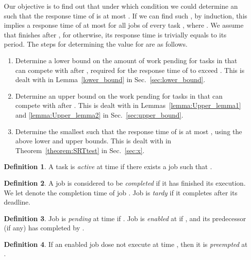\documentclass[Times, 10pt,twocolumn]{article}
\theoremstyle{definition}
\newtheorem{definition}{\textbf{Definition}}
\begin{document}
Our objective is to find out that under which condition we could determine an  such that the response time of  is at most . If we can find such , by induction, this implies a response time of at most  for all jobs of every task , where . We assume that  finishes after , for otherwise, its response time is trivially equals to its period. The steps for determining the value for  are as follows.
\vspace{-1.5mm}
\begin{enumerate}
\item
Determine a lower bound on the amount of work pending for tasks in  that can compete with  after , required for the response time of  to exceed . This is dealt with in Lemma~\ref{lower_bound} in Sec.~\ref{sec:lower_bound}.
\item \vspace{-1.5mm}
Determine an upper bound on the work pending for tasks in  that can compete with  after . This is dealt with in Lemmas~\ref{lemma:Upper_lemma1} and \ref{lemma:Upper_lemma2} in Sec.~\ref{sec:upper_bound}.
\item \vspace{-1.5mm}
Determine the smallest  such that the response time of  is at most , using the above lower and upper bounds. This is dealt with in Theorem~\ref{theorem:SRTtest} in Sec.~\ref{sec:x}.
\end{enumerate} 
\vspace{-2.5mm}
\begin{definition}
\label{def:active}
A task  is \textit{active} at time  if there exists a job  such that .
\end{definition}

\begin{definition}
\label{def:enabled}
A job is considered to be \textit{completed} if it has finished its execution. We let  denote the completion time of job . Job  is \textit{tardy} if it completes after its deadline.
\end{definition}

\begin{definition}
\label{def:pending}
 Job  is \textit{pending} at time  if . Job  is \textit{enabled} at  if , and its predecessor (if any) has completed by .  \end{definition}





\begin{definition}
\label{preemption} If an enabled job  dose not execute at time , then it is \textit{preempted} at . 
\end{definition}
\end{document}
